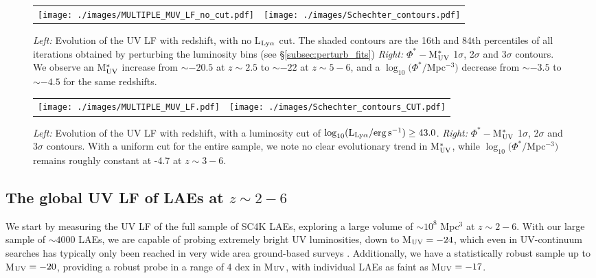 \documentclass[a4paper,fleqn,usenatbib]{mnras}
\begin{document}
%
%
\begin{figure*}
\begin{tabular}{ll}
  \centering
  \texttt{[image: ./images/MULTIPLE\_MUV\_LF\_no\_cut.pdf]}
  &
  \texttt{[image: ./images/Schechter\_contours.pdf]}  
\end{tabular}
  \caption{{\it Left:} Evolution of the UV LF with redshift, with no L$_{\rm Ly\alpha}$ cut. The shaded contours are the 16th and 84th percentiles of all iterations obtained by perturbing the luminosity bins (see \S\ref{subsec:perturb_fits}) {\it Right:} $\Phi^*-$M$_{\rm UV}^*$ 1$\sigma$, 2$\sigma$ and 3$\sigma$ contours. We observe an M$_{\rm UV}^*$ increase from $\sim-20.5$ at $z\sim2.5$ to $\sim-22$ at $z\sim5-6$, and a $\log_{10}(\Phi^*/$Mpc$^{-3})$ decrease from $\sim-3.5$ to $\sim-4.5$ for the same redshifts.}
  \label{fig:multiple_lf_no_cut}
\end{figure*}


%
%
\begin{figure*}
\begin{tabular}{ll}
  \centering
  \texttt{[image: ./images/MULTIPLE\_MUV\_LF.pdf]}
  &
  \texttt{[image: ./images/Schechter\_contours\_CUT.pdf]}  
\end{tabular}
  \caption{{\it Left:} Evolution of the UV LF with redshift, with a luminosity cut of $\log_{10} (\rm L_{Ly\alpha}/erg\,s^{-1}) \geq 43.0$. {\it Right:} $\Phi^*-$M$_{\rm UV}^*$ 1$\sigma$, 2$\sigma$ and 3$\sigma$ contours. With a uniform cut for the entire sample, we note no clear evolutionary trend in M$_{\rm UV}^*$, while $\log_{10}(\Phi^*/$Mpc$^{-3})$ remains roughly constant at -4.7 at $z\sim3-6$.}
  \label{fig:multiple_lf_cut}
\end{figure*}


\subsection{The global UV LF of LAEs at $z\sim2-6$}  \label{sec:muv_lf_evo}

We start by measuring the UV LF of the full sample of SC4K LAEs, exploring a large volume of $\sim10^8$ Mpc$^3$ at $z\sim2-6$. With our large sample of $\sim4000$ LAEs, we are capable of probing extremely bright UV luminosities, down to M$_{\rm UV}=-24$, which even in UV-continuum searches has typically only been reached in very wide area ground-based surveys \citep[e.g.][]{Bowler2017,Ono2018}. Additionally, we have a statistically robust sample up to M$_{\rm UV}=-20$, providing a robust probe in a range of 4 dex in M$_{\rm UV}$, with individual LAEs as faint as M$_{\rm UV}=-17$. 
\end{document}
